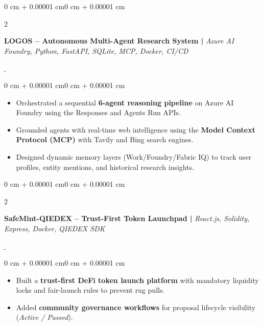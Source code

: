 \documentclass[1pt, letterpaper]{article}
\newenvironment{onecolentry}{
    \begin{adjustwidth}{0 cm + 0.00001 cm}{0 cm + 0.00001 cm}
}{\end{adjustwidth}}
\newenvironment{twocolentry}[2][]{
    \onecolentry
    \def\secondColumn{#2}
    \setcolumnwidth{\fill, 4.5 cm}
    \begin{paracol}{2}
}{
    \switchcolumn \raggedleft \secondColumn
    \end{paracol}
    \endonecolentry
}
\let\hrefWithoutArrow\href
\begin{document}
    \begin{twocolentry}{
        {\hrefWithoutArrow{https://github.com/madhesh60/logos_reasoning_agent}{\,\faExternalLink*}}%
    }
        \vspace{-3pt}
        \textbf{LOGOS – Autonomous Multi-Agent Research System |}
        \textit{Azure AI Foundry, Python, FastAPI, SQLite, MCP, Docker, CI/CD}
    \end{twocolentry}
    \begin{onecolentry}
        \vspace{0mm}
        \begin{itemize}
            \item Orchestrated a sequential \textbf{6-agent reasoning pipeline} on Azure AI Foundry using the Responses and Agents Run APIs.
            \item Grounded agents with real-time web intelligence using the \textbf{Model Context Protocol (MCP)} with Tavily and Bing search engines.
            \item Designed dynamic memory layers (Work/Foundry/Fabric IQ) to track user profiles, entity mentions, and historical research insights.
        \end{itemize}
    \end{onecolentry}
    \vspace{1.5mm}

    \begin{twocolentry}{
        {\hrefWithoutArrow{https://github.com/madhesh60/tokenCreator}{\,\faExternalLink*}}%
    }
        \vspace{-3pt}
        \textbf{SafeMint-QIEDEX – Trust-First Token Launchpad |}
        \textit{React.js, Solidity, Express, Docker, QIEDEX SDK}
    \end{twocolentry}
    \begin{onecolentry}
        \vspace{0mm}
        \begin{itemize}
            \setlength{\itemsep}{-0.8pt}
            \setlength{\parsep}{-0.8pt}
            \item Built a \textbf{trust-first DeFi token launch platform} with mandatory liquidity locks and fair-launch rules to prevent rug pulls.
            \item Added \textbf{community governance workflows} for proposal lifecycle visibility (\textit{Active / Passed}).
        \end{itemize}
    \end{onecolentry}
    \vspace{1.5mm}
\end{document}
